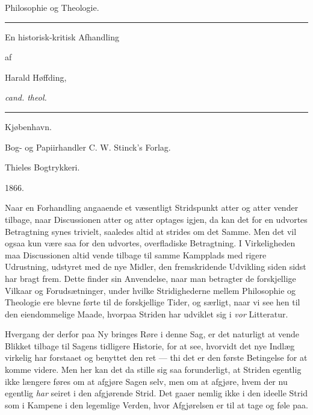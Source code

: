 \documentclass[12pt,a4paper]{book}
\newcommand{\opage}[1]{\marginnote{\footnotesize\textit{[#1]}}}
\begin{document}
\thispagestyle{empty}

\begin{center}
{\Huge Philosophie og Theologie.}\par
\rule{4em}{0.4pt}\par\bigskip
{\large En historisk-kritisk Afhandling}\par\medskip
af\par\medskip
{\large Harald Høffding,}\par
\textit{cand. theol.}\par\bigskip
\rule{6em}{0.8pt}\par\bigskip
Kjøbenhavn.\par
Bog- og Papiirhandler C. W. Stinck's Forlag.\par
{\small Thieles Bogtrykkeri.}\par
1866.
\end{center}
\clearpage

\opage{3}\setcounter{footnote}{0}%
Naar en Forhandling angaaende et væsentligt Stridspunkt
atter og atter vender tilbage, naar Discussionen atter og atter
optages igjen, da kan det for en udvortes Betragtning synes
trivielt, saaledes altid at strides om det Samme. Men det
vil ogsaa kun være saa for den udvortes, overfladiske Betragtning.
I Virkeligheden maa Discussionen altid vende tilbage
til samme Kampplads med rigere Udrustning, udstyret
med de nye Midler, den fremskridende Udvikling siden sidst
har bragt frem. Dette finder sin Anvendelse, naar man betragter
de forskjellige Vilkaar og Forudsætninger, under hvilke
Stridighederne mellem Philosophie og Theologie ere blevne
førte til de forskjellige Tider, og særligt, naar vi see hen til
den eiendommelige Maade, hvorpaa Striden har udviklet sig
i \emph{vor} Litteratur.

Hvergang der derfor paa Ny bringes Røre i denne Sag,
er det naturligt at vende Blikket tilbage til Sagens tidligere
Historie, for at see, hvorvidt det nye Indlæg virkelig har forstaaet
og benyttet den ret --- thi det er den første Betingelse
for at komme videre. Men her kan det da stille sig saa forunderligt,
at Striden egentlig ikke længere føres om at afgjøre
Sagen selv, men om at afgjøre, hvem der nu egentlig \emph{har}
seiret i den afgjørende Strid. Det gaaer nemlig ikke i den
ideelle Strid som i Kampene i den legemlige Verden, hvor
Afgjørelsen er til at tage og føle paa.
\end{document}
